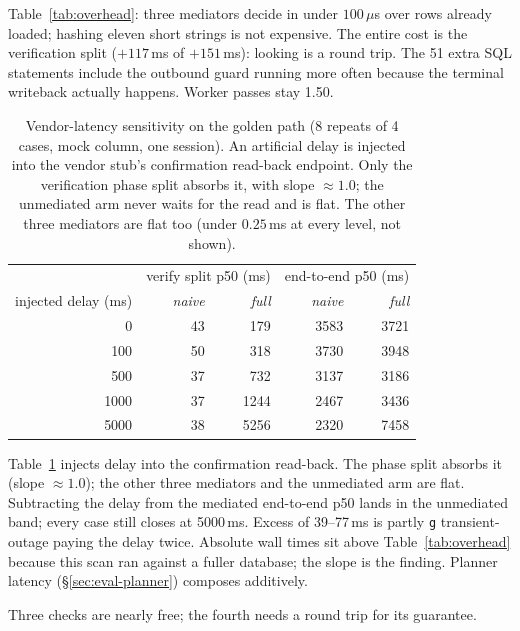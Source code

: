 \documentclass[acmsmall,manuscript,review,anonymous]{acmart}
\renewcommand{\_}{\discretionary{\textunderscore}{}{\textunderscore}}
\begin{document}
Table~\ref{tab:overhead}: three mediators decide in under $100\,\mu$s
over rows already loaded; hashing eleven short strings is not
expensive. The entire cost is the verification split ($+117$\,ms of
$+151$\,ms): looking is a round trip. The 51 extra SQL statements
include the outbound guard running more often because the terminal
writeback actually happens. Worker passes stay 1.50.

\begin{table}[t]
\centering
\small
\caption{Vendor-latency sensitivity on the golden path (8 repeats of 4 cases,
mock column, one session). An artificial delay is injected into the vendor
stub's confirmation read-back endpoint. Only the verification phase split
absorbs it, with slope $\approx 1.0$; the unmediated arm never waits for the
read and is flat. The other three mediators are flat too (under $0.25$\,ms at
every level, not shown).}
\label{tab:vendor-latency}
\begin{tabular}{@{}rrrrr@{}}
\hline
 & \multicolumn{2}{c}{verify split p50 (ms)} & \multicolumn{2}{c}{end-to-end p50 (ms)}\\
injected delay (ms) & \emph{naive} & \emph{full} & \emph{naive} & \emph{full}\\
\hline
0    & 43 & 179   & 3583 & 3721\\
100  & 50 & 318   & 3730 & 3948\\
500  & 37 & 732   & 3137 & 3186\\
1000 & 37 & 1244  & 2467 & 3436\\
5000 & 38 & 5256  & 2320 & 7458\\
\hline
\end{tabular}
\end{table}

Table~\ref{tab:vendor-latency} injects delay into the confirmation
read-back. The phase split absorbs it (slope $\approx 1.0$); the other
three mediators and the unmediated arm are flat. Subtracting the delay
from the mediated end-to-end p50 lands in the unmediated band; every
case still closes at 5000\,ms. Excess of 39--77\,ms is partly
\texttt{g} transient-outage paying the delay twice. Absolute wall times
sit above Table~\ref{tab:overhead} because this scan ran against a
fuller database; the slope is the finding. Planner latency
(\S\ref{sec:eval-planner}) composes additively.

Three checks are nearly free; the fourth needs a round trip for its
guarantee.
\end{document}
